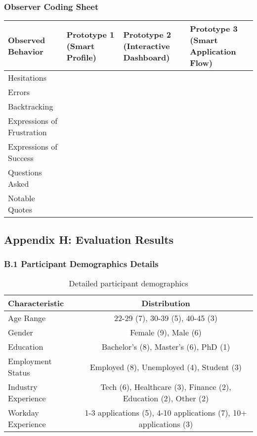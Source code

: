 \documentclass[
	letterpaper, %
]{jdf}
\begin{document}
\subsubsection{Observer Coding Sheet}

\begin{tabular}{|p{3cm}|p{3cm}|p{3cm}|p{3cm}|}
\hline
\textbf{Observed Behavior} & \textbf{Prototype 1 (Smart Profile)} & \textbf{Prototype 2 (Interactive Dashboard)} & \textbf{Prototype 3 (Smart Application Flow)} \\
\hline
Hesitations & & & \\
\hline
Errors & & & \\
\hline
Backtracking & & & \\
\hline
Expressions of Frustration & & & \\
\hline
Expressions of Success & & & \\
\hline
Questions Asked & & & \\
\hline
Notable Quotes & & & \\
\hline
\end{tabular}

\hfill \break

\subsection{Appendix H: Evaluation Results}
\subsubsection{B.1 Participant Demographics Details}

\begin{table}[h]
\centering
\begin{tabular}{|l|c|}
\hline
\textbf{Characteristic} & \textbf{Distribution} \\
\hline
Age Range & 22-29 (7), 30-39 (5), 40-45 (3) \\
\hline
Gender & Female (9), Male (6) \\
\hline
Education & Bachelor's (8), Master's (6), PhD (1) \\
\hline
Employment Status & Employed (8), Unemployed (4), Student (3) \\
\hline
Industry Experience & Tech (6), Healthcare (3), Finance (2), Education (2), Other (2) \\
\hline
Workday Experience & 1-3 applications (5), 4-10 applications (7), 10+ applications (3) \\
\hline
\end{tabular}
\caption{Detailed participant demographics}
\end{table}
\end{document}
